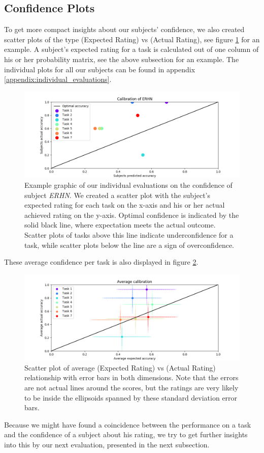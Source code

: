 \documentclass[../main/main.tex]{subfiles}
\begin{document}
\subsection{Confidence Plots}
To get more compact insights about our subjects' confidence, we also created scatter plots of the type (Expected Rating) vs (Actual Rating), see figure \ref{fig:erhn_confidence} for an example. A subject's expected rating for a task is calculated out of one column of his or her probability matrix, see the above subsection for an example. The individual plots for all our subjects can be found in appendix \ref{appendix:individual_evaluations}.
\begin{figure}[H]
	\centering
	\captionsetup{justification=centering}
	\includegraphics[width=\textwidth]{../assets/ERHN_calibration.png}
	\caption{Example graphic of our individual evaluations on the confidence of subject \textit{ERHN}. We created a scatter plot with the subject's expected rating for each task on the x-axis and his or her actual achieved rating on the y-axis. Optimal confidence is indicated by the solid black line, where expectation meets the actual outcome. Scatter plots of tasks above this line indicate underconfidence for a task, while scatter plots below the line are a sign of overconfidence.}
	\label{fig:erhn_confidence} 
\end{figure}
These average confidence per task is also displayed in figure \ref{fig:avg_confidence}.
\begin{figure}[H]
	\centering
	\captionsetup{justification=centering}
	\includegraphics[width=\textwidth]{../assets/average_calibration.png}
	\caption{Scatter plot of average (Expected Rating) vs (Actual Rating) relationship with error bars in both dimensions. Note that the errors are not actual lines around the scores, but the ratings are very likely to be inside the ellipsoids spanned by these standard deviation error bars.}
	\label{fig:avg_confidence} 
\end{figure}
Because we might have found a coincidence between the performance on a task and the confidence of a subject about his rating, we try to get further insights into this by our next evaluation, presented in the next subsection.
\end{document}
